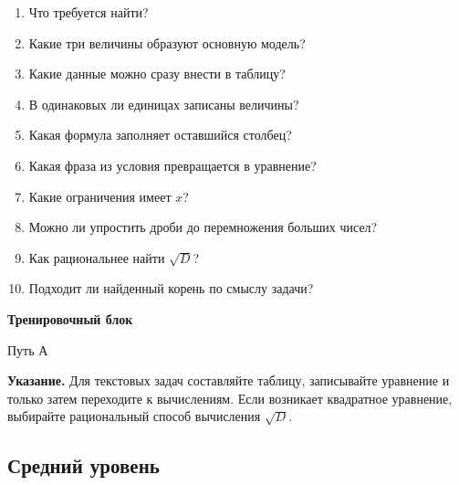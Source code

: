 \documentclass[a4paper,12pt]{article}
\begin{document}
\begin{enumerate}
  \item Что требуется найти?
  \item Какие три величины образуют основную модель?
  \item Какие данные можно сразу внести в таблицу?
  \item В одинаковых ли единицах записаны величины?
  \item Какая формула заполняет оставшийся столбец?
  \item Какая фраза из условия превращается в уравнение?
  \item Какие ограничения имеет \(x\)?
  \item Можно ли упростить дроби до перемножения больших чисел?
  \item Как рациональнее найти \(\sqrt D\)?
  \item Подходит ли найденный корень по смыслу задачи?
\end{enumerate}


\clearpage

\thispagestyle{fancy}

\begin{center}
{\LARGE\bfseries\color{darkaccent}Тренировочный блок}

\vspace{2mm}

{\large Путь А}
\end{center}

\vspace{3mm}

\textbf{Указание.}
Для текстовых задач составляйте таблицу, записывайте уравнение и только затем переходите к вычислениям. Если возникает квадратное уравнение, выбирайте рациональный способ вычисления \(\sqrt D\).

\subsection*{\color{darkaccent}Средний уровень}
\end{document}
